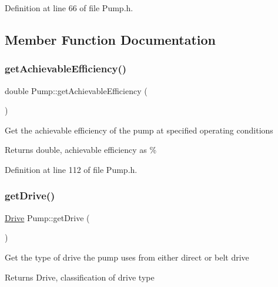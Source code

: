 Definition at line 66 of file Pump.\+h.



\subsection{Member Function Documentation}
\mbox{\label{class_pump_acf100af543142ab8404fc0ce2df1d157}} 
\subsubsection{\texorpdfstring{get\+Achievable\+Efficiency()}{getAchievableEfficiency()}}
{\footnotesize\ttfamily double Pump\+::get\+Achievable\+Efficiency (\begin{DoxyParamCaption}{ }\end{DoxyParamCaption})\hspace{0.3cm}{\ttfamily [inline]}}

Get the achievable efficiency of the pump at specified operating conditions

\begin{DoxyReturn}{Returns}
double, achievable efficiency as \% 
\end{DoxyReturn}


Definition at line 112 of file Pump.\+h.

\mbox{\label{class_pump_a7eae412e42d0a3351408391cd5fbef4e}} 
\subsubsection{\texorpdfstring{get\+Drive()}{getDrive()}}
{\footnotesize\ttfamily \hyperlink{class_pump_a32bf0ade131a11bb3b3fb374f638e983}{Drive} Pump\+::get\+Drive (\begin{DoxyParamCaption}{ }\end{DoxyParamCaption})\hspace{0.3cm}{\ttfamily [inline]}}

Get the type of drive the pump uses from either direct or belt drive

\begin{DoxyReturn}{Returns}
Drive, classification of drive type 
\end{DoxyReturn}


